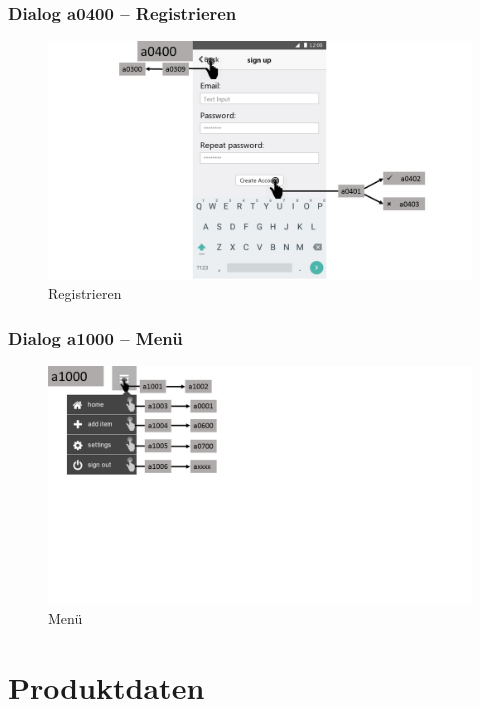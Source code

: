 \documentclass[a4paper,12pt,oneside]{scrartcl}
\begin{document}
\subsubsection{Dialog a0400 – Registrieren}
\begin{figure}[!htbp]
\centering
\noindent\includegraphics[width=\linewidth,height=\textheight,keepaspectratio]{Dialoge/a0400}
\caption{Registrieren}
\end{figure}
\FloatBarrier

\subsubsection{Dialog a1000 – Menü}
\begin{figure}[!htbp]
\centering
\noindent\includegraphics[width=\linewidth,height=\textheight,keepaspectratio]{Dialoge/a1000}
\caption{Menü}
\end{figure}
\FloatBarrier


\section{Produktdaten}
\end{document}
